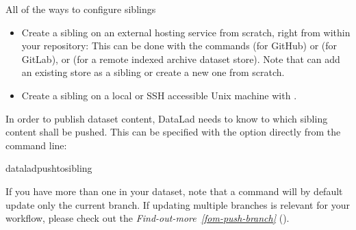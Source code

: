 \begin{findoutmore}[label={fom-all-siblings}, before title={\thetcbcounter\ }, float, floatplacement=tb, check odd page=true]{All of the ways to configure siblings}
\begin{itemize}
\item {} 
\sphinxAtStartPar
Create a sibling on an external hosting service from scratch, right from
within your repository:
This can be done with the commands  (for GitHub)
or  (for GitLab), or
 (for a remote indexed archive dataset store).
Note that  can add an existing store as a sibling
or create a new one from scratch.

\item {} 
\sphinxAtStartPar
Create a sibling on a local or SSH accessible Unix machine with
.

\end{itemize}


\end{findoutmore}

\sphinxAtStartPar
In order to publish dataset content, DataLad needs to know to which sibling
content shall be pushed. This can be specified with the  option directly
from the command line:

\begin{sphinxVerbatim}[commandchars=\\\{\}]
dataladpush\PYGZhy{}\PYGZhy{}to\PYGZlt{}sibling\PYGZgt{}
\end{sphinxVerbatim}

\sphinxAtStartPar
If you have more than one {\hyperref[\detokenize{glossary:term-branch}]{}} in your dataset, note that a
 command will by default update only the current branch.
If updating multiple branches is relevant for your workflow, please check out
the \textit{Find-out-more}~{\findoutmoreiconinline}\textit{\ref{fom-push-branch}} {\hyperref[\detokenize{basics/101-141-push:fom-push-branch}]{}} ().


